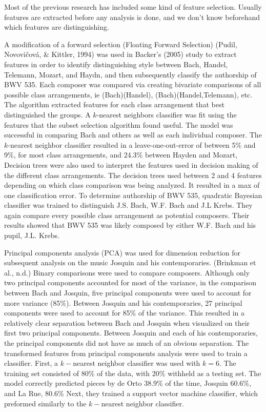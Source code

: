 \documentclass[12pt,twoside]{reedthesis}
\theoremstyle{definition}
\theoremstyle{definition}
\theoremstyle{definition}
\theoremstyle{remark}
\begin{document}
Most of the previous research has included some kind of feature
selection. Usually features are extracted before any analysis is done,
and we don't know beforehand which features are distinguishing.

A modification of a forward selection (Floating Forward Selection)
(Pudil, Novovičová, \& Kittler, 1994) was used in Backer's (2005) study
to extract features in order to identify distinguishing style between
Bach, Handel, Telemann, Mozart, and Haydn, and then subsequently
classify the authorship of BWV 535. Each composer was compared via
creating bivariate comparisons of all possible class arrangements, ie
(Bach)(Handel), (Bach)(Handel,Telemann), etc. The algorithm extracted
features for each class arrangement that best distinguished the groups.
A \(k\)-nearest neighbors classifier was fit using the features that the
subset selection algorithm found useful. The model was successful in
comparing Bach and others as well as each individual composer. The
\(k\)-nearest neighbor classifier resulted in a leave-one-out-error of
between 5\% and 9\%, for most class arrangements, and 24.3\% between
Hayden and Mozart, Decision trees were also used to interpret the
features used in decision making of the different class arrangements.
The decision trees used between 2 and 4 features depending on which
class comparison was being analyzed. It resulted in a max of one
classification error. To determine authorship of BWV 535, quadratic
Bayesian classifier was trained to distinguish J.S. Bach, W.F. Bach and
J.L Krebs. They again compare every possible class arrangement as
potential composers. Their results showed that BWV 535 was likely
composed by either W.F. Bach and his pupil, J.L. Krebs.

Principal components analysis (PCA) was used for dimension reduction for
subsequent analysis on the music Josquin and his contemporaries.
(Brinkman et al., n.d.) Binary comparisons were used to compare
composers. Although only two principal components accounted for most of
the variance, in the comparison between Bach and Josquin, five principal
components were used to account for more variance (85\%). Between
Josquin and his contemporaries, 27 principal components were used to
account for 85\% of the variance. This resulted in a relatively clear
separation between Bach and Josquin when visualized on their first two
principal components. Between Josquin and each of his contemporaries,
the principal components did not have as much of an obvious separation.
The transformed features from principal components analysis were used to
train a classifier. First, a \(k-\)nearest neighbor classifier was used
with \(k = 6\). The training set consisted of 80\% of the data, with
20\% withheld as a testing set. The model correctly predicted pieces by
de Orto 38.9\% of the time, Josquin 60.6\%, and La Rue, 80.6\% Next,
they trained a support vector machine classifier, which preformed
similarly to the \(k-\)nearest neighbor classifier.
\end{document}
